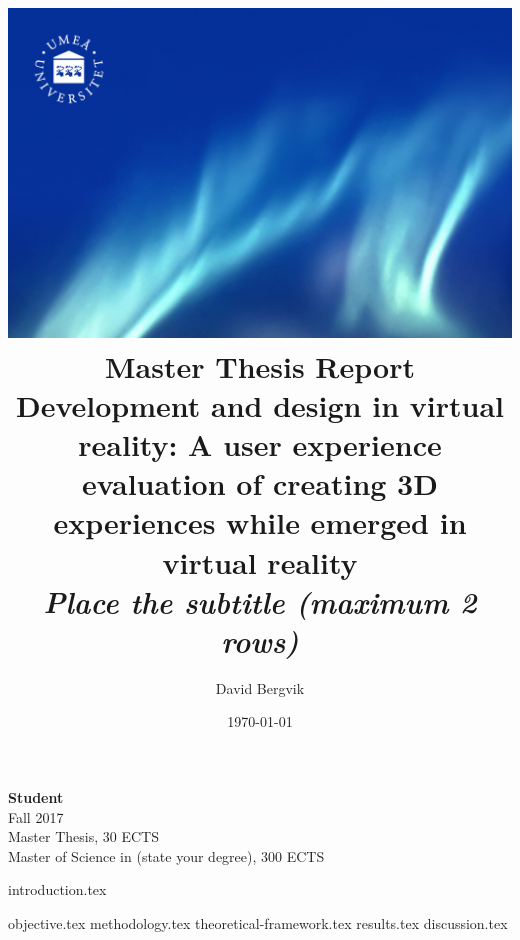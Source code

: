 \documentclass[a4paper,table]{article}
\title{
    \includegraphics[width=1\textwidth]{front.jpg} \\
    \vspace{0.7cm}
     Master Thesis Report\\
    \vspace{0.6cm}
    \LARGE Development and design in virtual reality: A user experience evaluation of creating 3D experiences while emerged in virtual reality \\ %
    \vspace{0.7cm}
    \large\textit{Place the subtitle (maximum 2 rows)}
    \vspace{0.8cm}
}
\author{
    David Bergvik
}
\date{\today}
\begin{document}
\pretitle{\begin{flushleft} \georgia \fontsize{30}{34}\selectfont}
\posttitle{\end{flushleft}}
\preauthor{\begin{flushleft} \georgia \linespread{1.4} \large}
\postauthor{\end{flushleft}}
\predate{} %
\postdate{} %

\maketitle
\vfill
\begin{flushleft}
    \small
    \textbf{Student} \\
    Fall 2017 \\
    Master Thesis, 30 ECTS\\
    Master of Science in (state your degree), 300 ECTS
\end{flushleft}

\thispagestyle{empty}
\restoregeometry
{introduction.tex}

{objective.tex}
{methodology.tex}
{theoretical-framework.tex}
{results.tex}
{discussion.tex}
\end{document}
